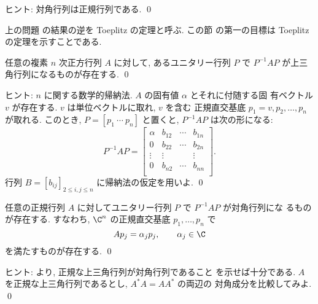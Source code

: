 \documentclass[12pt,twoside]{jarticle}
\begin{document}
\noindent
ヒント: 対角行列は正規行列である.
\qed

\medskip

上の問題  の結果の逆を Toeplitz の定理と呼ぶ.  この節
の第一の目標は Toeplitz の定理を示すことである.


\begin{question}[任意の行列の三角化可能性]
\label{q:triangularizable}
  任意の複素 $n$ 次正方行列 $A$ に対して,
  あるユニタリー行列 $P$ で $P^{-1}AP$ が上三角行列になるものが存在する.
  \qed
\end{question}

\noindent
ヒント: $n$ に関する数学的帰納法.  $A$ の固有値 $\alpha$ とそれに付随する固
有ベクトル $v$ が存在する. $v$ は単位ベクトルに取れ, $v$ を含む
正規直交基底 $p_1=v,p_2,\dots,p_n$ が取れる.  
このとき, $P=[p_1\ \cdots\ p_n]$ と置くと, $P^{-1}AP$ は次の形になる:
\begin{equation*}
  P^{-1}AP = 
  \begin{bmatrix}
    \alpha & b_{12} & \cdots & b_{1n} \\
       0   & b_{22} & \cdots & b_{2n} \\
    \vdots & \vdots &        & \vdots \\
       0   & b_{n2} & \cdots & b_{nn} \\
  \end{bmatrix}.
\end{equation*}
行列 $B=[b_{ij}]_{2\le i,j\le n}$ に帰納法の仮定を用いよ.
\qed


\begin{question}
\label{q:Toeplitz}
  任意の正規行列 $A$ に対してユニタリー行列 $P$ で $P^{-1}AP$ が対角行列にな 
  るものが存在する. すなわち, $\C^n$ の正規直交基底 $p_1,\dots,p_n$ で
  \begin{equation*}
    A p_j = \alpha_j p_j, \qquad \alpha_j \in \C
  \end{equation*}
  を満たすものが存在する. \qed
\end{question}

\noindent
ヒント:  より, 正規な上三角行列が対角行列であること
を示せば十分である.  $A$ を正規な上三角行列であるとし, $A^*A=AA^*$ の両辺の
対角成分を比較してみよ.
\qed

\end{document}
